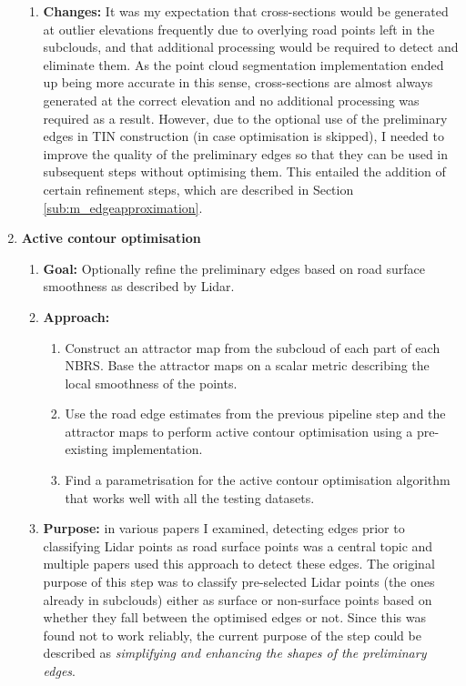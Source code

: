 \begin{enumerate}
\begin{enumerate}
        \item \textbf{Changes:} It was my expectation that cross-sections would be generated at outlier elevations frequently due to overlying road points left in the subclouds, and that additional processing would be required to detect and eliminate them. As the point cloud segmentation implementation ended up being more accurate in this sense, cross-sections are almost always generated at the correct elevation and no additional processing was required as a result. However, due to the optional use of the preliminary edges in TIN construction (in case optimisation is skipped), I needed to improve the quality of the preliminary edges so that they can be used in subsequent steps without optimising them. This entailed the addition of certain refinement steps, which are described in Section \ref{sub:m_edgeapproximation}.
    \end{enumerate}
    \item \textbf{Active contour optimisation}
    \begin{enumerate}
        \item \textbf{Goal:} Optionally refine the preliminary edges based on road surface smoothness as described by Lidar.
        \item \textbf{Approach:}
        \begin{enumerate}
            \item Construct an attractor map from the subcloud of each part of each NBRS. Base the attractor maps on a scalar metric describing the local smoothness of the points.
            \item Use the road edge estimates from the previous pipeline step and the attractor maps to perform active contour optimisation using a pre-existing implementation.
            \item Find a parametrisation for the active contour optimisation algorithm that works well with all the testing datasets.
        \end{enumerate}
        \item \textbf{Purpose:} in various papers I examined, detecting edges prior to classifying Lidar points as road surface points was a central topic and multiple papers used this approach to detect these edges. The original purpose of this step was to classify pre-selected Lidar points (the ones already in subclouds) either as surface or non-surface points based on whether they fall between the optimised edges or not. Since this was found not to work reliably, the current purpose of the step could be described as \textit{simplifying and enhancing the shapes of the preliminary edges}.

\end{enumerate}
\end{enumerate}
